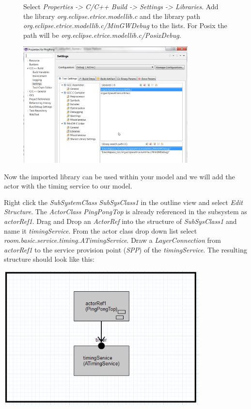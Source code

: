 \begin{figure}[ht]
\begin{minipage}[t]{0.50\linewidth}
\begin{mdframed}
Select \emph{Properties -> C/C++ Build -> Settings -> Libraries}. Add the library \emph{org.eclipse.etrice.modellib.c} and the library path 
\emph{org.eclipse.etrice.modellib.c/MinGWDebug} to the lists. For Posix the path will be \emph{org.eclipse.etrice.modellib.c/PosixDebug}.
	
\includegraphics[width=0.8\textwidth]{images/017-07-Settings-for-C-Libraries.png}

\end{mdframed}
\end{minipage}
\end{figure}

Now the imported library can be used within your model and we will add the actor with the timing service to our model.

Right click the \emph{SubSystemClass} \emph{SubSysClass1} in the outline view and select \textit{Edit Structure}. The \emph{ActorClass} \emph{PingPongTop} is already referenced in the subsystem as \textit{actorRef1}. Drag and 
Drop an \textit{ActorRef} into the structure of \emph{SubSysClass1} and name it \textit{timingService}. From the actor class drop down list select \textit{room.basic.service.timing.ATimingService}. Draw a 
\textit{LayerConnection} from \textit{actorRef1} to the service provision point (\emph{SPP}) of the 
\textit{timingService}. The resulting structure should look like this:

\includegraphics[width=0.8\textwidth]{images/017-08-SubSystem-with-timing-service.png}

